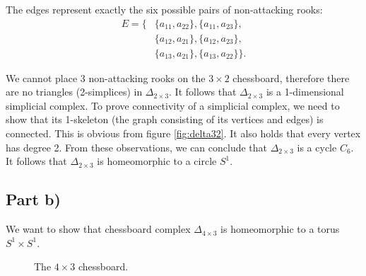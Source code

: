 \documentclass[11pt,a4paper]{article}
\theoremstyle{plain}
\theoremstyle{definition}
\theoremstyle{remark}
\begin{document}
\noindent
The edges represent exactly the six possible pairs of non-attacking rooks:
\[
\begin{aligned}
E=\{&
\{a_{11},a_{22}\},
\{a_{11},a_{23}\},\\
&\{a_{12},a_{21}\},
\{a_{12},a_{23}\},\\
&\{a_{13},a_{21}\},
\{a_{13},a_{22}\}
\}.
\end{aligned}
\]

\noindent
We cannot place 3 non-attacking rooks on the $3 \times 2$ chessboard, therefore there are no triangles (2-simplices) in
$\Delta_{2\times3}$. It follows that $\Delta_{2\times3}$ is a 1-dimensional simplicial complex. To prove connectivity of a simplicial complex, we
need to show that its 1-skeleton (the graph consisting of its vertices and edges) is connected. This is obvious from figure \ref{fig:delta32}.
It also holds that every vertex has degree 2. From these observations, we can conclude that $\Delta_{2\times3}$ is a cycle $C_6$.
It follows that $\Delta_{2\times3}$ is homeomorphic to a circle $S^1$.

\subsection{Part b)}
We want to show that chessboard complex $\Delta_{4 \times 3}$ is homeomorphic to a torus $S^1 \times S^1$. 

\vspace*{15px}

\begin{figure}[h]
\centering
{}
\caption{The $4\times3$ chessboard.}
\end{figure}
\end{document}

